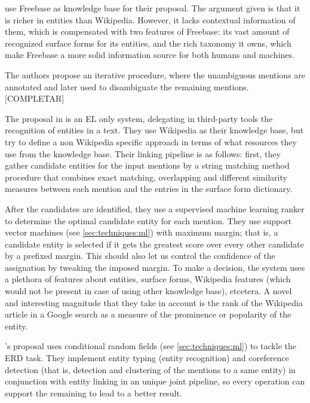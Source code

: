 \medskip

\cite{zheng2012} use Freebase as knowledge base for their proposal. The argument given is that it is richer in entities than Wikipedia. However, it lacks contextual information of them, which is compensated with two features of Freebase: its vast amount of recognized surface forms for its entities, and the rich taxonomy it owns, which make Freebase a more solid information source for both humans and machines.

The authors propose an iterative procedure, where the unambiguous mentions are annotated and later used to disambiguate the remaining mentions. {\color{red}[COMPLETAR]}

\medskip

The proposal in \cite{rao2013} is an EL only system, delegating in third-party tools the recognition of entities in a text. They use Wikipedia as their knowledge base, but try to define a non Wikipedia specific approach in terms of what resources they use from the knowledge base. Their linking pipeline is as follows: first, they gather candidate entities for the input mentions by a string matching method procedure that combines exact matching, overlapping and different similarity measures between each mention and the entries in the surface form dictionary.

After the candidates are identified, they use a supervised machine learning ranker to determine the optimal candidate entity for each mention. They use support vector machines (see \autoref{sec:techniques:ml}) with maximum margin; that is, a candidate entity is selected if it gets the greatest score over every other candidate by a prefixed margin. This should also let us control the confidence of the assignation by tweaking the imposed margin. To make a decision, the system uses a plethora of features about entities, surface forms, Wikipedia features (which would not be present in case of using other knowledge base), etcetera. A novel and interesting magnitude that they take in account is the rank of the Wikipedia article in a Google search as a measure of the prominence or popularity of the entity.

\medskip

\cite{durrett2014}'s proposal uses conditional random fields (see \autoref{sec:techniques:ml}) to tackle the ERD task. They implement entity typing (entity recognition) and coreference detection (that is, detection and clustering of the mentions to a same entity) in conjunction with entity linking in an unique joint pipeline, so every operation can support the remaining to lead to a better result.

